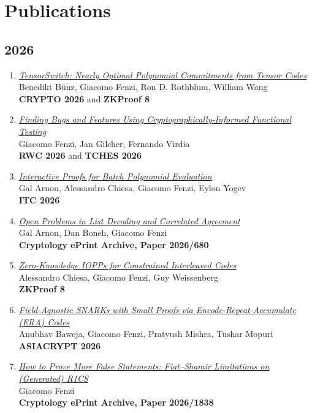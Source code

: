 \documentclass[11pt,a4paper]{article}
\begin{document}
\section*{Publications}

\subsection*{2026}
\begin{enumerate}
  \item \href{https://eprint.iacr.org/2025/2065}{\textit{TensorSwitch: Nearly Optimal Polynomial Commitments from Tensor Codes}}\\
  Benedikt Bünz, Giacomo Fenzi, Ron D. Rothblum, William Wang\\
  \textbf{CRYPTO 2026} and \textbf{ZKProof 8}

  \item \href{https://eprint.iacr.org/2024/1122}{\textit{Finding Bugs and Features Using Cryptographically-Informed Functional Testing}}\\
  Giacomo Fenzi, Jan Gilcher, Fernando Virdia\\
  \textbf{RWC 2026} and \textbf{TCHES 2026}

  \item \href{https://eprint.iacr.org/2026/448}{\textit{Interactive Proofs for Batch Polynomial Evaluation}}\\
  Gal Arnon, Alessandro Chiesa, Giacomo Fenzi, Eylon Yogev\\
  \textbf{ITC 2026}

  \item \href{https://eprint.iacr.org/2026/680}{\textit{Open Problems in List Decoding and Correlated Agreement}}\\
  Gal Arnon, Dan Boneh, Giacomo Fenzi\\
  \textbf{Cryptology ePrint Archive, Paper 2026/680}

  \item \href{https://eprint.iacr.org/2026/391}{\textit{Zero-Knowledge IOPPs for Constrained Interleaved Codes}}\\
  Alessandro Chiesa, Giacomo Fenzi, Guy Weissenberg\\
  \textbf{ZKProof 8}

  \item \href{https://eprint.iacr.org/2026/864}{\textit{Field-Agnostic SNARKs with Small Proofs via Encode-Repeat-Accumulate (ERA) Codes}}\\
  Anubhav Baweja, Giacomo Fenzi, Pratyush Mishra, Tushar Mopuri\\
  \textbf{ASIACRYPT 2026}

  \item \href{https://eprint.iacr.org/2026/1838}{\textit{How to Prove More False Statements: Fiat--Shamir Limitations on (Generated) R1CS}}\\
  Giacomo Fenzi\\
  \textbf{Cryptology ePrint Archive, Paper 2026/1838}
\end{enumerate}
\end{document}

